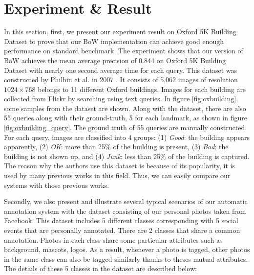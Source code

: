\section{Experiment \& Result} \label{section:experiment_result}

In this section, first, we present our experiment result on Oxford 5K Building Dataset to prove that our BoW implementation can achieve good enough performance on standard benchmark. The experiment shows that our version of BoW achieves the mean average precision of 0.844 on Oxford 5K Building Dataset with nearly one second average time for each query. This dataset was constructed by Philbin et al. in 2007 \cite{2}. It consists of 5,062 images of resolution $1024 \times 768$ belongs to 11 different Oxford buildings. Images for each building are collected from Flickr by searching using text queries. In figure \ref{fig:oxbuilding}, some samples from the dataset are shown. Along with the dataset, there are also 55 queries along with their ground-truth, 5 for each landmark, as shown in figure \ref{fig:oxbuilding_query}. The ground truth of 55 queries are manually constructed. For each query, images are classified into 4 groups: (1) \textit{Good}: the building appears apparently, (2) \textit{OK}: more than 25\% of the building is present, (3) \textit{Bad}: the building is not shown up, and (4) \textit{Junk}: less than 25\% of the building is captured. The reason why the authors use this dataset is because of its popularity, it is used by many previous works in this field. Thus, we can easily compare our systems with those previous works.

Secondly, we also present and illustrate several typical scenarios of our automatic annotation system with the dataset consisting of our personal photos taken from Facebook. This dataset includes 5 different classes corresponding with 5 social events that are personally annotated. There are 2 classes that share a common annotation. Photos in each class share some particular attributes such as background, mascots, logos. As a result, whenever a photo is tagged, other photos in the same class can also be tagged similarly thanks to theses mutual attributes. The details of these 5 classes in the dataset are described below:

